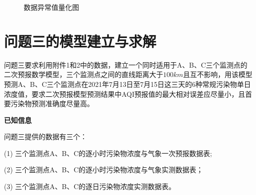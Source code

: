 \documentclass[a4paper,10pt]{my_paper}
\numberwithin{equation}{section}
\begin{document}
\begin{figure}[htbp]
{    

  }
  \caption{数据异常值量化图}\label{fig_异常值}
\end{figure}



\section{问题三的模型建立与求解}
问题三要求利用附件1和2中的数据，建立一个同时适用于A、B、C三个监测点的二次预报数学模型，三个监测点之间的直线距离大于${100km}$且互不影响，用该模型预测A、B、C三个监测点在2021年7月13日至7月15日这三天的6种常规污染物单日浓度值，要求二次预报模型预测结果中AQI预报值的最大相对误差应尽量小，且首要污染物预测准确度尽量高。

\textbf{已知信息}

问题三提供的数据有三个：

(1) 三个监测点A、B、C的逐小时污染物浓度与气象一次预报数据表;

(2) 三个监测点A、B、C的逐小时污染物浓度与气象实测数据表；

(3) 三个监测点A、B、C的逐日污染物浓度实测数据表。


\end{document}
